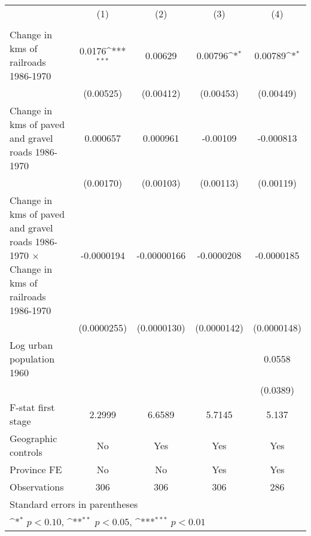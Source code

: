 {
\def\sym#1{\ifmmode^{#1}\else\(^{#1}\)\fi}
\begin{tabular}{l*{4}{c}}
\hline\hline
                &\multicolumn{1}{c}{(1)}&\multicolumn{1}{c}{(2)}&\multicolumn{1}{c}{(3)}&\multicolumn{1}{c}{(4)}\\
                &\multicolumn{1}{c}{}&\multicolumn{1}{c}{}&\multicolumn{1}{c}{}&\multicolumn{1}{c}{}\\
\hline
Change in kms of railroads 1986-1970&   0.0176\sym{***}&  0.00629         &  0.00796\sym{*}  &  0.00789\sym{*}  \\
                &(0.00525)         &(0.00412)         &(0.00453)         &(0.00449)         \\
[1em]
Change in kms of paved and gravel roads 1986-1970& 0.000657         & 0.000961         & -0.00109         &-0.000813         \\
                &(0.00170)         &(0.00103)         &(0.00113)         &(0.00119)         \\
[1em]
Change in kms of paved and gravel roads 1986-1970 $\times$ Change in kms of railroads 1986-1970&-0.0000194         &-0.00000166         &-0.0000208         &-0.0000185         \\
                &(0.0000255)         &(0.0000130)         &(0.0000142)         &(0.0000148)         \\
[1em]
Log urban population 1960&                  &                  &                  &   0.0558         \\
                &                  &                  &                  & (0.0389)         \\
\hline
F-stat first stage&   2.2999         &   6.6589         &   5.7145         &    5.137         \\
Geographic controls&       No         &      Yes         &      Yes         &      Yes         \\
Province FE     &       No         &       No         &      Yes         &      Yes         \\
Observations    &      306         &      306         &      306         &      286         \\
\hline\hline
\multicolumn{5}{l}{\footnotesize Standard errors in parentheses}\\
\multicolumn{5}{l}{\footnotesize \sym{*} \(p<0.10\), \sym{**} \(p<0.05\), \sym{***} \(p<0.01\)}\\
\end{tabular}
}

